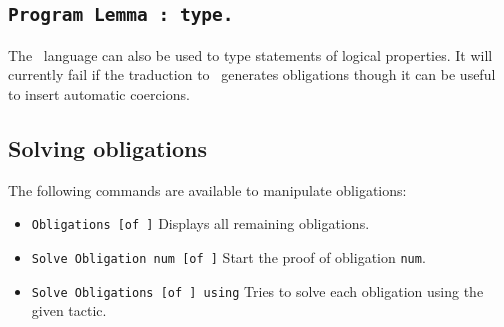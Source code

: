 \subsection{\tt Program Lemma {\ident} : type.
  \label{ProgramLemma}}

The \Russell\ language can also be used to type statements of logical
properties. It will currently fail if the traduction to \Coq\
generates obligations though it can be useful to insert automatic coercions.

\subsection{Solving obligations}
The following commands are available to manipulate obligations:

\begin{itemize}
\item {\tt Obligations [of \ident]} Displays all remaining
  obligations.
\item {\tt Solve Obligation num [of \ident]} Start the proof of
  obligation {\tt num}.
\item {\tt Solve Obligations [of \ident] using} {\tacexpr} Tries to solve
  each obligation using the given tactic.
\end{itemize}
  




